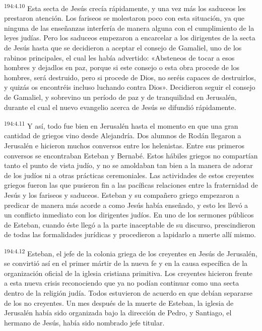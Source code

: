 \par 
\textsuperscript{194:4.10} Esta secta de Jesús crecía rápidamente, y una vez más los saduceos les prestaron atención. Los fariseos se molestaron poco con esta situación, ya que ninguna de las enseñanzas interfería de manera alguna con el cumplimiento de la leyes judías. Pero los saduceos empezaron a encarcelar a los dirigentes de la secta de Jesús hasta que se decidieron a aceptar el consejo de Gamaliel, uno de los rabinos principales, el cual les había advertido: «Absteneos de tocar a esos hombres y dejadlos en paz, porque si este consejo o esta obra procede de los hombres, será destruido, pero si procede de Dios, no seréis capaces de destruirlos, y quizás os encontréis incluso luchando contra Dios». Decidieron seguir el consejo de Gamaliel, y sobrevino un período de paz y de tranquilidad en Jerusalén, durante el cual el nuevo evangelio acerca de Jesús se difundió rápidamente.

\par 
\textsuperscript{194:4.11} Y así, todo fue bien en Jerusalén hasta el momento en que una gran cantidad de griegos vino desde Alejandría. Dos alumnos de Rodán llegaron a Jerusalén e hicieron muchos conversos entre los helenistas. Entre sus primeros conversos se encontraban Esteban y Bernabé. Estos hábiles griegos no compartían tanto el punto de vista judío, y no se amoldaban tan bien a la manera de adorar de los judíos ni a otras prácticas ceremoniales. Las actividades de estos creyentes griegos fueron las que pusieron fin a las pacíficas relaciones entre la fraternidad de Jesús y los fariseos y saduceos. Esteban y su compañero griego empezaron a predicar de manera más acorde a como Jesús había enseñado, y esto les llevó a un conflicto inmediato con los dirigentes judíos. En uno de los sermones públicos de Esteban, cuando éste llegó a la parte inaceptable de su discurso, prescindieron de todas las formalidades jurídicas y procedieron a lapidarlo a muerte allí mismo.

\par 
\textsuperscript{194:4.12} Esteban, el jefe de la colonia griega de los creyentes en Jesús de Jerusalén, se convirtió así en el primer mártir de la nueva fe y en la causa específica de la organización oficial de la iglesia cristiana primitiva. Los creyentes hicieron frente a esta nueva crisis reconociendo que ya no podían continuar como una secta dentro de la religión judía. Todos estuvieron de acuerdo en que debían separarse de los no creyentes. Un mes después de la muerte de Esteban, la iglesia de Jerusalén había sido organizada bajo la dirección de Pedro, y Santiago, el hermano de Jesús, había sido nombrado jefe titular.

